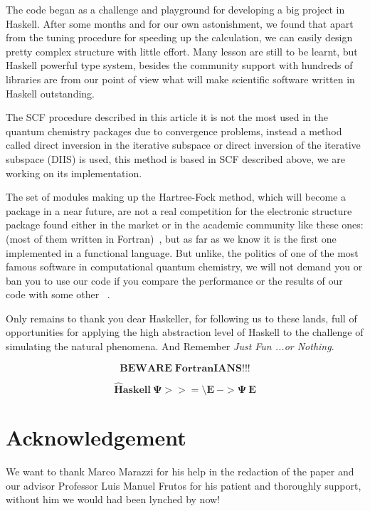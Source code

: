 \documentclass{tmr}
\begin{document}
The code began as a challenge and playground for developing a big project 
in Haskell. After some months and for our own astonishment, we found that
apart from the tuning procedure for speeding up the calculation, we can
easily design pretty complex structure with little effort. Many lesson 
are still to be learnt, but Haskell powerful type system, besides the 
community support with hundreds of libraries are from our point of view what will make 
scientific software written in Haskell outstanding.

The SCF procedure described in this article it is not the most used in
the quantum chemistry packages due to convergence problems, instead a
 method called direct inversion in the iterative subspace or direct
inversion of the iterative subspace (DIIS) is used, this method is 
based in SCF described above, we are working on its implementation.

The set of modules making up the Hartree-Fock method, which will 
become a package in a near future, are not a real competition
for the electronic structure package found either in the market
or in the academic community like these ones: (most of them
written in Fortran)~\cite{software},
but as far as we know it is the first one implemented in a 
functional language. But unlike, the politics of one of the 
most famous software in computational quantum chemistry, we
will not demand you or ban you to use our code if you
compare the performance or the results of our code with some
other ~\cite{banned}. 

Only remains to thank you dear Haskeller, for following us to these 
lands, full of opportunities for applying the high abstraction level
of Haskell to the challenge of simulating the natural phenomena. And
Remember \textit{Just Fun ...or Nothing}. 

\[\mathbf{BEWARE\;FortranIANS!!!} \]


\[\mathbf{\hat{H}askell\: \Psi >>= \setminus E\: -> \Psi\: E }\]

\section{Acknowledgement}

We want to thank Marco Marazzi for his help
in the redaction of the paper and our advisor
Professor Luis Manuel Frutos for his patient
and thoroughly support, without
him we would had been lynched by now!
\end{document}
